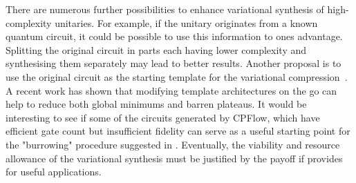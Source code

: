 \documentclass[twocolumn, amsfonts, amssymb, aps, nofootinbib]{revtex4-2}
\begin{document}
There are numerous further possibilities to  enhance variational synthesis of high-complexity unitaries. For example, if the unitary originates from a known quantum circuit, it could be possible to use this information to ones advantage. Splitting the original circuit in parts each having lower complexity and synthesising them separately may lead to better results. Another proposal is to use the original circuit as the starting template for the variational compression~\cite{Rakyta2022}. A recent work \cite{Grimsley2022} has shown that modifying template architectures on the go can help to reduce both global minimums and barren plateaus. It would be interesting to see if some of the circuits generated by CPFlow, which have efficient gate count but insufficient fidelity can serve as a useful starting point for the "burrowing" procedure suggested in \cite{Grimsley2022}. Eventually, the viability and resource allowance of the variational synthesis must be justified by the payoff if provides for useful applications.
\end{document}
